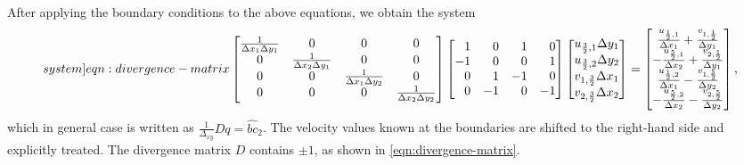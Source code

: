 \documentclass{article}
\begin{document}
After applying the boundary conditions to the above equations, we obtain the system
\begin{equation}\label[system]{eqn:divergence-matrix}
	\begin{bmatrix}{}
		\frac{1}{\Delta x_1\Delta y_1}		&0	&0	&0\\
		0		&\frac{1}{\Delta x_2\Delta y_1}	&0	&0\\
		0		&0	&\frac{1}{\Delta x_1\Delta y_2}	&0\\
		0		&0	&0	&\frac{1}{\Delta x_2\Delta y_2}
	\end{bmatrix}
	\begin{bmatrix*}[r]{}
		1	&0	&1	&0\\
		-1	&0	&0	&1\\
		0	&1	&-1	&0\\
		0	&-1	&0	&-1
	\end{bmatrix*}
	\begin{bmatrix}{}
	u_{\frac{3}{2},1}	\Delta y_1\\
	u_{\frac{3}{2},2}	\Delta y_2\\
	v_{1,\frac{3}{2}}	\Delta x_1\\
	v_{2,\frac{3}{2}}	\Delta x_2\\
	\end{bmatrix}
	=
	\begin{bmatrix}{}
	\frac{u_{\frac{1}{2},1}}{\Delta x_1}		+	\frac{v_{1,\frac{1}{2}}}{\Delta y_1}\\
	-\frac{u_{\frac{5}{2},1}}{\Delta x_2}	+ 	\frac{v_{2,\frac{1}{2}}}{\Delta y_1}\\
	\frac{u_{\frac{1}{2},2}}{\Delta x_1} 	-	\frac{v_{1,\frac{5}{2}}}{\Delta y_2}\\
	-\frac{u_{\frac{5}{2},2}}{\Delta x_2}		-\frac{v_{2,\frac{5}{2}}}{\Delta y_2}	
	\end{bmatrix},
\end{equation}
which in general case is written as 
$\frac{1}{\Delta_{xy}} D q=\hat{bc}_2$.
The velocity values known at the boundaries are shifted to the right-hand side and explicitly treated. The divergence matrix $D$ contains $\pm1$, as shown in \cref{eqn:divergence-matrix}.


\end{document}

